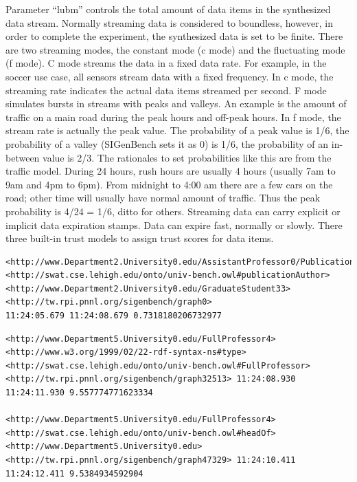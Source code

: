 Parameter ``lubm'' controls the total amount of data items in the synthesized data stream. 
Normally streaming data is considered to boundless, however, in order to complete the experiment, the synthesized data is set to be finite. 
There are two streaming modes, the constant mode (c mode) and the fluctuating mode (f mode).
C mode streams the data in a fixed data rate.
For example, in the soccer use case, all sensors stream data with a fixed frequency.
In c mode, the streaming rate indicates the actual data items streamed per second. 
F mode simulates bursts in streams with peaks and valleys. 
An example is the amount of traffic on a main road during the peak hours and off-peak hours. 
In f mode, the stream rate is actually the peak value. 
The probability of a peak value is 1/6, the probability of a valley (SIGenBench sets it as 0) is 1/6, the probability of an in-between value is 2/3. 
The rationales to set probabilities like this are from the traffic model. 
During 24 hours, rush hours are usually 4 hours (usually 7am to 9am and 4pm to 6pm).
From midnight to 4:00 am there are a few cars on the road; other time will usually have normal amount of traffic. 
Thus the peak probability is 4/24 = 1/6, ditto for others.
Streaming data can carry explicit or implicit data expiration stamps.
Data can expire fast, normally or slowly.
There three built-in trust models to assign trust scores for data items.

\begin{lstlisting}[caption={\textbf{Generated RDF Stream Example 1}},basicstyle=\tiny]
<http://www.Department2.University0.edu/AssistantProfessor0/Publication7> 
<http://swat.cse.lehigh.edu/onto/univ-bench.owl#publicationAuthor>
<http://www.Department2.University0.edu/GraduateStudent33> 
<http://tw.rpi.pnnl.org/sigenbench/graph0> 
11:24:05.679 11:24:08.679 0.7318180206732977
\end{lstlisting}

\begin{lstlisting}[caption={\textbf{Generated RDF Stream Example 2}},basicstyle=\tiny]
<http://www.Department5.University0.edu/FullProfessor4>
<http://www.w3.org/1999/02/22-rdf-syntax-ns#type>
<http://swat.cse.lehigh.edu/onto/univ-bench.owl#FullProfessor>
<http://tw.rpi.pnnl.org/sigenbench/graph32513> 11:24:08.930 11:24:11.930 9.557774771623334

<http://www.Department5.University0.edu/FullProfessor4>
<http://swat.cse.lehigh.edu/onto/univ-bench.owl#headOf>
<http://www.Department5.University0.edu>
<http://tw.rpi.pnnl.org/sigenbench/graph47329> 11:24:10.411 11:24:12.411 9.5384934592904
\end{lstlisting}

